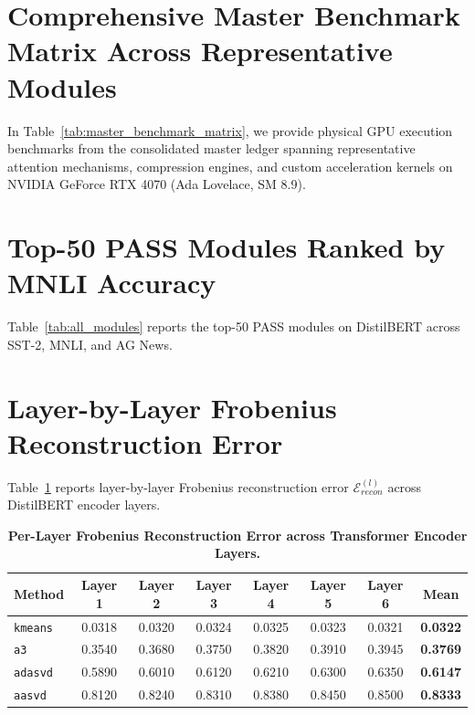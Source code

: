 \documentclass{article}
\begin{document}
\clearpage
\section{Comprehensive Master Benchmark Matrix Across Representative Modules}
\label{app:master_benchmark_matrix}
In Table~\ref{tab:master_benchmark_matrix}, we provide physical GPU execution benchmarks from the consolidated master ledger spanning representative attention mechanisms, compression engines, and custom acceleration kernels on NVIDIA GeForce RTX 4070 (Ada Lovelace, SM 8.9).


\clearpage
\section{Top-50 PASS Modules Ranked by MNLI Accuracy}
\label{app:top50}
Table~\ref{tab:all_modules} reports the top-50 PASS modules on DistilBERT across SST-2, MNLI, and AG News.


\clearpage
\section{Layer-by-Layer Frobenius Reconstruction Error}
\label{app:recon_error}
Table~\ref{tab:layer_recon} reports layer-by-layer Frobenius reconstruction error $\mathcal{E}_{recon}^{(l)}$ across DistilBERT encoder layers.
\begin{table}[ht]
\centering
\footnotesize
\setlength{\tabcolsep}{5pt}
\caption{\textbf{Per-Layer Frobenius Reconstruction Error across Transformer Encoder Layers.}}
\label{tab:layer_recon}
\begin{tabular}{lcccccc|c}
\toprule
\textbf{Method} & \textbf{Layer 1} & \textbf{Layer 2} & \textbf{Layer 3} & \textbf{Layer 4} & \textbf{Layer 5} & \textbf{Layer 6} & \textbf{Mean} \\
\midrule
\texttt{kmeans} & 0.0318 & 0.0320 & 0.0324 & 0.0325 & 0.0323 & 0.0321 & \textbf{0.0322} \\
\texttt{a3} & 0.3540 & 0.3680 & 0.3750 & 0.3820 & 0.3910 & 0.3945 & \textbf{0.3769} \\
\texttt{adasvd} & 0.5890 & 0.6010 & 0.6120 & 0.6210 & 0.6300 & 0.6350 & \textbf{0.6147} \\
\texttt{aasvd} & 0.8120 & 0.8240 & 0.8310 & 0.8380 & 0.8450 & 0.8500 & \textbf{0.8333} \\
\bottomrule
\end{tabular}
\end{table}
\end{document}
